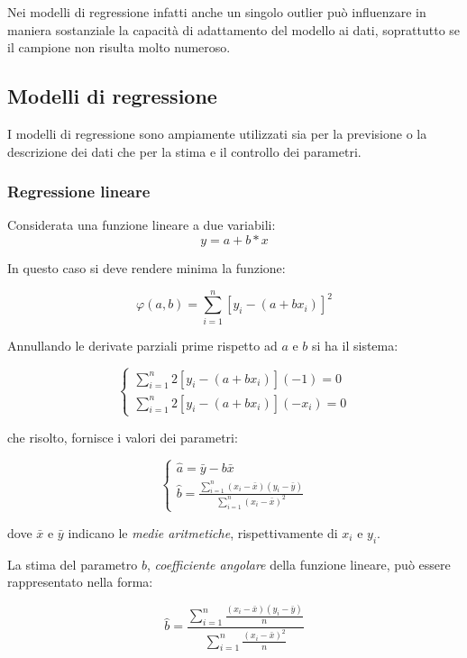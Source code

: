 Nei modelli di regressione infatti anche un singolo outlier può influenzare in maniera sostanziale la capacità di adattamento del modello ai dati, soprattutto se il campione non risulta molto numeroso.

\subsection{Modelli di regressione}\label{ssec:regressione-modelli}
I modelli di regressione sono ampiamente utilizzati sia per la previsione o la descrizione dei dati che per la stima e il controllo dei parametri.

\subsubsection{Regressione lineare}\label{sssec:regressione-lineare}
Considerata una funzione lineare a due variabili:
$$y = a + b*x$$

In questo caso si deve rendere minima la funzione:

$$\varphi(a, b)=\sum_{i=1}^{n}\left[y_{i}-\left(a+b x_{i}\right)\right]^{2}$$\smallskip

Annullando le derivate parziali prime rispetto ad $a$ e $b$ si ha il sistema:

$$\left\{\begin{array}{l}
\sum_{i=1}^{n} 2\left[y_{i}-\left(a+b x_{i}\right)\right](-1)=0 \\
\sum_{i=1}^{n} 2\left[y_{i}-\left(a+b x_{i}\right)\right]\left(-x_{i}\right)=0
\end{array}\right.$$\smallskip

che risolto, fornisce i valori dei parametri:

$$\left\{\begin{array}{l}
\hat{a}=\bar{y}-b \bar{x} \\
\hat{b}=\frac{\sum_{i=1}^{n}\left(x_{i}-\bar{x}\right)\left(y_{i}-\bar{y}\right)}{\sum_{i=1}^{n}\left(x_{i}-\bar{x}\right)^{2}}
\end{array}\right.$$\smallskip

dove $\bar{x}$ e $\bar{y}$ indicano le \textit{medie aritmetiche}, rispettivamente di $x_i$ e $y_i$.

La stima del parametro $b$, \textit{coefficiente angolare} della funzione lineare, può essere rappresentato nella forma:

$$\hat{b}=\frac{\sum_{i=1}^{n} \frac{\left(x_{i}-\bar{x}\right)\left(y_{i}-\bar{y}\right)}{n}}{\sum_{i=1}^{n} \frac{\left(x_{i}-\bar{x}\right)^{2}}{n}}$$\smallskip

